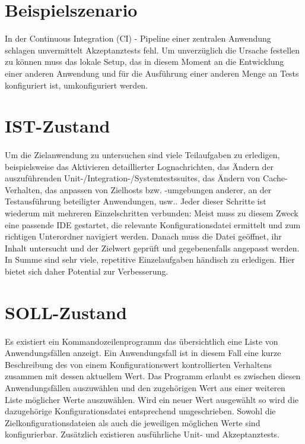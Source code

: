 \documentclass[a4paper,11pt]{article}
\begin{document}
\section{Beispielszenario}
In der Continuous Integration (CI) - Pipeline einer zentralen Anwendung schlagen
unvermittelt Akzeptanztests fehl. Um unverzüglich die Ursache festellen zu können
muss das lokale Setup, das in diesem Moment an die Entwicklung einer anderen
Anwendung und für die Ausführung einer anderen Menge an Tests konfiguriert ist,
umkonfiguriert werden.

\section{IST-Zustand}
\paragraph{}
Um die Zielanwendung zu untersuchen sind viele Teilaufgaben zu erledigen,
beispielsweise das Aktivieren detaillierter Lognachrichten, das Ändern der
auszuführenden Unit-/Integration-/Systemtestssuites, das Ändern von Cache-Verhalten,
das anpassen von Zielhosts bzw. -umgebungen anderer, an der Testausführung
beteiligter Anwendungen, usw.. Jeder dieser Schritte ist wiederum mit mehreren
Einzelschritten verbunden: Meist muss zu diesem Zweck eine passende IDE gestartet,
die relevante Konfigurationsdatei ermittelt und zum richtigen Unterordner navigiert
werden. Danach muss die Datei geöffnet, ihr Inhalt untersucht und der Zielwert
geprüft und gegebenenfalls angepasst werden. In Summe sind sehr viele,
repetitive Einzelaufgaben händisch zu erledigen. Hier bietet sich daher Potential
zur Verbesserung.

\section{SOLL-Zustand}
\paragraph{}
Es existiert ein Kommandozeilenprogramm das übersichtlich eine Liste von
Anwendungsfällen anzeigt. Ein Anwendungsfall ist in diesem Fall eine kurze
Beschreibung des von einem Konfigurationswert kontrollierten Verhaltens zusammen
mit dessen aktuellem Wert. Das Programm erlaubt es zwischen diesen
Anwendungsfällen auszuwählen und den zugehörigen Wert aus einer weiteren Liste
möglicher Werte auszuwählen. Wird ein neuer Wert ausgewählt so wird die
dazugehörige Konfigurationsdatei entsprechend umgeschrieben. Sowohl die
Zielkonfigurationsdateien als auch die jeweiligen möglichen Werte sind
konfigurierbar. Zusätzlich existieren ausführliche Unit- und Akzeptanztests.
\end{document}
